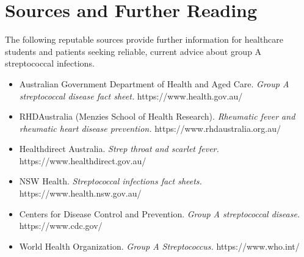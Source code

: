 \section*{Sources and Further Reading}
The following reputable sources provide further information for healthcare students and patients seeking reliable, current advice about group A streptococcal infections.

\begin{itemize}
    \item Australian Government Department of Health and Aged Care. \textit{Group A streptococcal disease fact sheet.} https://www.health.gov.au/
    \item RHDAustralia (Menzies School of Health Research). \textit{Rheumatic fever and rheumatic heart disease prevention.} https://www.rhdaustralia.org.au/
    \item Healthdirect Australia. \textit{Strep throat and scarlet fever.} https://www.healthdirect.gov.au/
    \item NSW Health. \textit{Streptococcal infections fact sheets.} https://www.health.nsw.gov.au/
    \item Centers for Disease Control and Prevention. \textit{Group A streptococcal disease.} https://www.cdc.gov/
    \item World Health Organization. \textit{Group A Streptococcus.} https://www.who.int/
\end{itemize}
